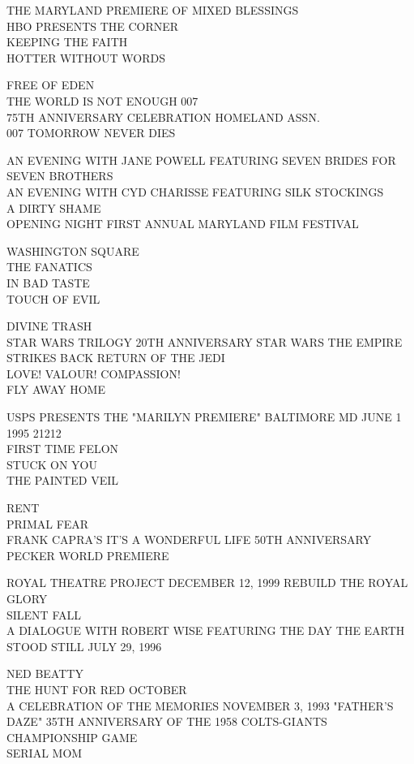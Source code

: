 \documentclass[10pt,letterpaper]{article}
\begin{document}
THE MARYLAND PREMIERE OF MIXED BLESSINGS\\
HBO PRESENTS THE CORNER\\
KEEPING THE FAITH\\
HOTTER WITHOUT WORDS

FREE OF EDEN\\
THE WORLD IS NOT ENOUGH 007\\
75TH ANNIVERSARY CELEBRATION HOMELAND ASSN.\\
007 TOMORROW NEVER DIES

AN EVENING WITH JANE POWELL FEATURING SEVEN BRIDES FOR SEVEN BROTHERS\\
AN EVENING WITH CYD CHARISSE FEATURING SILK STOCKINGS\\
A DIRTY SHAME\\
OPENING NIGHT FIRST ANNUAL MARYLAND FILM FESTIVAL

WASHINGTON SQUARE\\
THE FANATICS\\
IN BAD TASTE\\
TOUCH OF EVIL

DIVINE TRASH\\
STAR WARS TRILOGY 20TH ANNIVERSARY STAR WARS THE EMPIRE STRIKES BACK RETURN OF THE JEDI\\
LOVE!  VALOUR!  COMPASSION!\\
FLY AWAY HOME

USPS PRESENTS THE "MARILYN PREMIERE" BALTIMORE MD JUNE 1 1995 21212\\
FIRST TIME FELON\\
STUCK ON YOU\\
THE PAINTED VEIL

RENT\\
PRIMAL FEAR\\
FRANK CAPRA'S IT'S A WONDERFUL LIFE 50TH ANNIVERSARY\\
PECKER WORLD PREMIERE

ROYAL THEATRE PROJECT DECEMBER 12, 1999 REBUILD THE ROYAL\\
GLORY\\
SILENT FALL\\
A DIALOGUE WITH ROBERT WISE FEATURING THE DAY THE EARTH STOOD STILL JULY 29, 1996

NED BEATTY\\
THE HUNT FOR RED OCTOBER\\
A CELEBRATION OF THE MEMORIES NOVEMBER 3, 1993 "FATHER'S DAZE" 35TH ANNIVERSARY OF THE 1958 COLTS{-}GIANTS CHAMPIONSHIP GAME\\
SERIAL MOM
\end{document}
